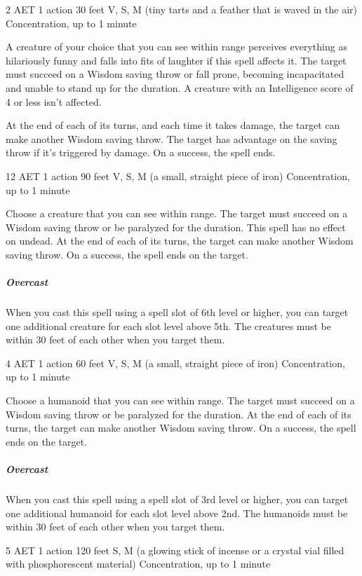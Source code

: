 \label{spell:hideous-laughter}
{2 AET}
{1 action}
{30 feet}
{V, S, M (tiny tarts and a feather that is waved in the air)}
{Concentration, up to 1 minute}

A creature of your choice that you can see within range perceives everything as hilariously funny and falls into fits of laughter if this spell affects it. The target must succeed on a Wisdom saving throw or fall prone, becoming incapacitated and unable to stand up for the duration. A creature with an Intelligence score of 4 or less isn't affected.

At the end of each of its turns, and each time it takes damage, the target can make another Wisdom saving throw. The target has advantage on the saving throw if it's triggered by damage. On a success, the spell ends.

\label{spell:hold-monster}
{12 AET}
{1 action}
{90 feet}
{V, S, M (a small, straight piece of iron)}
{Concentration, up to 1 minute}

Choose a creature that you can see within range. The target must succeed on a Wisdom saving throw or be paralyzed for the duration. This spell has no effect on undead. At the end of each of its turns, the target can make another Wisdom saving throw. On a success, the spell ends on the target.
\subparagraph*{Overcast} When you cast this spell using a spell slot of 6th level or higher, you can target one additional creature for each slot level above 5th. The creatures must be within 30 feet of each other when you target them.

\label{spell:hold-person}
{4 AET}
{1 action}
{60 feet}
{V, S, M (a small, straight piece of iron)}
{Concentration, up to 1 minute}

Choose a humanoid that you can see within range. The target must succeed on a Wisdom saving throw or be paralyzed for the duration. At the end of each of its turns, the target can make another Wisdom saving throw. On a success, the spell ends on the target.
\subparagraph*{Overcast} When you cast this spell using a spell slot of 3rd level or higher, you can target one additional humanoid for each slot level above 2nd. The humanoids must be within 30 feet of each other when you target them.

\label{spell:hypnotic-pattern}
{5 AET}
{1 action}
{120 feet}
{S, M (a glowing stick of incense or a crystal vial filled with phosphorescent material)}
{Concentration, up to 1 minute}

